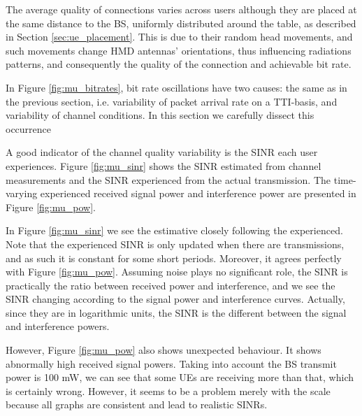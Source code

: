 The average quality of connections varies across users although they are placed at the same distance to the BS, uniformly distributed around the table, as described in Section \ref{sec:ue_placement}. This is due to their random head movements, and such movements change \acs{HMD} antennas' orientations, thus influencing radiations patterns, and consequently the quality of the connection and achievable bit rate.


In Figure \ref{fig:mu_bitrates}, bit rate oscillations have two causes: the same as in the previous section, i.e. variability of packet arrival rate on a TTI-basis, and variability of channel conditions. In this section we carefully dissect this occurrence 

A good indicator of the channel quality variability is the SINR each user experiences. Figure \ref{fig:mu_sinr} shows the SINR estimated from channel measurements and the SINR experienced from the actual transmission. The time-varying experienced received signal power and interference power are presented in Figure \ref{fig:mu_pow}.




\vspace{.4cm}

In Figure \ref{fig:mu_sinr} we see the estimative closely following the experienced. Note that the experienced SINR is only updated when there are transmissions, and as such it is constant for some short periods. Moreover, it agrees perfectly with Figure \ref{fig:mu_pow}. Assuming noise plays no significant role, the SINR is practically the ratio between received power and interference, and we see the SINR changing according to the signal power and interference curves. Actually, since they are in logarithmic units, the SINR is the different between the signal and interference powers.

However, Figure \ref{fig:mu_pow} also shows unexpected behaviour. It shows abnormally high received signal powers. Taking into account the \acs{BS} transmit power is 100 mW, we can see that some \acsp{UE} are receiving more than that, which is certainly wrong. However, it seems to be a problem merely with the scale because all graphs are consistent and lead to realistic \acsp{SINR}.

